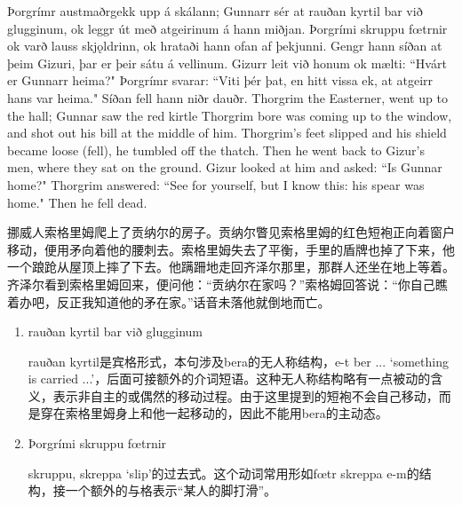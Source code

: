 \begin{paracol}{2}
    Þorgrímr austmaðr\footnotemark[1] gekk upp á skálann; Gunnarr sér at rauðan kyrtil bar við glugginum, ok leggr út með atgeirinum á hann miðjan. Þorgrími skruppu fœtrnir ok varð lauss skjǫldrinn, ok hrataði hann ofan af þekjunni. Gengr hann síðan at þeim Gizuri, þar er þeir sátu á vellinum. Gizurr leit við honum ok mælti: ``Hvárt er Gunnarr heima?" Þorgrímr svarar: ``Viti þér þat, en hitt vissa ek, at atgeirr hans var heima." Síðan fell hann niðr dauðr.
    \switchcolumn
    Thorgrim the Easterner, went up to the hall; Gunnar saw the red kirtle Thorgrim bore was coming up to the window, and shot out his bill at the middle of him. Thorgrim's feet slipped and his shield became loose (fell), he tumbled off the thatch. Then he went back to Gizur's men, where they sat on the ground. Gizur looked at him and asked: ``Is Gunnar home?" Thorgrim answered: ``See for yourself, but I know this: his spear was home." Then he fell dead.
\end{paracol}
\begin{translation*}{}
    挪威人索格里姆爬上了贡纳尔的房子。贡纳尔瞥见索格里姆的红色短袍正向着窗户移动，便用矛向着他的腰刺去。索格里姆失去了平衡，手里的盾牌也掉了下来，他一个踉跄从屋顶上摔了下去。他蹒跚地走回齐泽尔那里，那群人还坐在地上等着。齐泽尔看到索格里姆回来，便问他：“贡纳尔在家吗？”索格姆回答说：“你自己瞧着办吧，反正我知道他的矛在家。”话音未落他就倒地而亡。
\end{translation*}
\begin{grammar*}{}
    \begin{enumerate}[leftmargin=*]
        \item rauðan kyrtil bar við glugginum

              rauðan kyrtil是宾格形式，本句涉及bera的无人称结构，e-t ber ... `something is carried ...'，后面可接额外的介词短语。这种无人称结构略有一点被动的含义，表示非自主的或偶然的移动过程。由于这里提到的短袍不会自己移动，而是穿在索格里姆身上和他一起移动的，因此不能用bera的主动态。

        \item Þorgrími skruppu fœtrnir

              skruppu, skreppa `slip'的过去式。这个动词常用形如fœtr skreppa e-m的结构，接一个额外的与格表示“某人的脚打滑”。
    \end{enumerate}
\end{grammar*}
